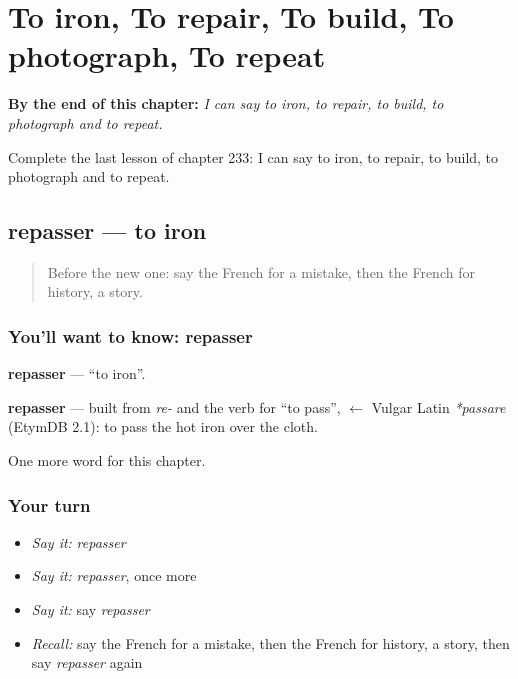 
\chapter{To iron, To repair, To build, To photograph, To repeat}
\label{ch:fr-to-iron-to-repair-to-build-to-photograph-to-repeat}

\begin{chapteropening}
\textbf{By the end of this chapter:} \emph{I can say to iron, to repair, to build, to photograph and to repeat.}

Complete the last lesson of chapter 233: I can say to iron, to repair, to build, to photograph and to repeat.
\end{chapteropening}

\section[repasser]{repasser — to iron}

\label{lesson:FR-C233-repasser}



\begin{quote}
Before the new one: say the French for a mistake, then the French for history, a story.
\end{quote}

\subsection*{You'll want to know: repasser}
\textbf{repasser} — \textquotedblleft{}to iron\textquotedblright{}.

\begin{cousinweb}
\textbf{repasser} — built from \emph{re-} and the verb for \textquotedblleft{}to pass\textquotedblright{}, $\leftarrow$ Vulgar Latin \emph{*passare} (EtymDB 2.1): to pass the hot iron over the cloth.
\end{cousinweb}

\begin{grammarlens}[title={What you've built}]
One more word for this chapter.
\end{grammarlens}

\subsection*{Your turn}
\begin{itemize}
\raggedright
  \item \emph{Say it:} \emph{repasser}
  \item \emph{Say it:} \emph{repasser}, once more
  \item \emph{Say it:} say \emph{repasser}
  \item \emph{Recall:} say the French for a mistake, then the French for history, a story, then say \emph{repasser} again
\end{itemize}

